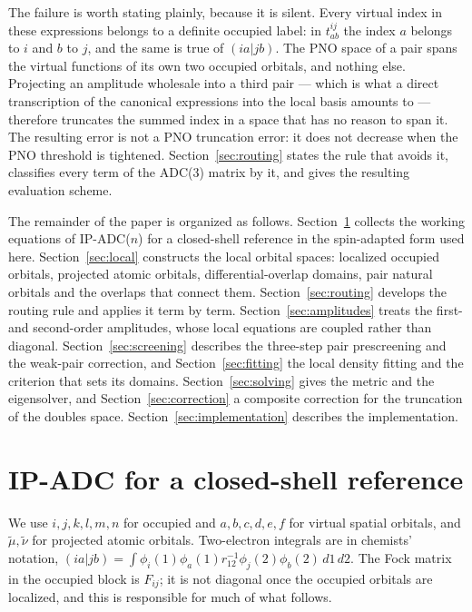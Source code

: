 \documentclass[aip,jcp,amsmath,amssymb,preprint,superscriptaddress]{revtex4-2}%
\newcommand{\pao}[1]{\tilde{#1}}
\begin{document}
The failure is worth stating plainly, because it is silent. Every virtual
index in these expressions belongs to a definite occupied label: in
$t^{ij}_{ab}$ the index $a$ belongs to $i$ and $b$ to $j$, and the same is
true of $(ia|jb)$. The PNO space of a pair spans the virtual functions of its
own two occupied orbitals, and nothing else. Projecting an amplitude wholesale
into a third pair --- which is what a direct transcription of the canonical
expressions into the local basis amounts to --- therefore truncates the summed
index in a space that has no reason to span it. The resulting error is not a
PNO truncation error: it does not decrease when the PNO threshold is
tightened. Section~\ref{sec:routing} states the rule that avoids it,
classifies every term of the ADC(3) matrix by it, and gives the resulting
evaluation scheme.

The remainder of the paper is organized as follows.
Section~\ref{sec:adc} collects the working equations of IP-ADC($n$) for a
closed-shell reference in the spin-adapted form used here.
Section~\ref{sec:local} constructs the local orbital spaces: localized
occupied orbitals, projected atomic orbitals, differential-overlap domains,
pair natural orbitals and the overlaps that connect them.
Section~\ref{sec:routing} develops the routing rule and applies it term by
term. Section~\ref{sec:amplitudes} treats the first- and second-order
amplitudes, whose local equations are coupled rather than diagonal.
Section~\ref{sec:screening} describes the three-step pair prescreening and the
weak-pair correction, and Section~\ref{sec:fitting} the local density fitting
and the criterion that sets its domains. Section~\ref{sec:solving} gives the
metric and the eigensolver, and Section~\ref{sec:correction} a composite
correction for the truncation of the doubles space.
Section~\ref{sec:implementation} describes the implementation.

\section{IP-ADC for a closed-shell reference}
\label{sec:adc}

We use $i,j,k,l,m,n$ for occupied and $a,b,c,d,e,f$ for virtual spatial
orbitals, and $\pao{\mu},\pao{\nu}$ for projected atomic orbitals. Two-electron
integrals are in chemists' notation, $(ia|jb)=\int
\phi_i(1)\phi_a(1)r_{12}^{-1}\phi_j(2)\phi_b(2)\,d1\,d2$. The Fock matrix in
the occupied block is $F_{ij}$; it is not diagonal once the occupied orbitals
are localized, and this is responsible for much of what follows.
\end{document}
